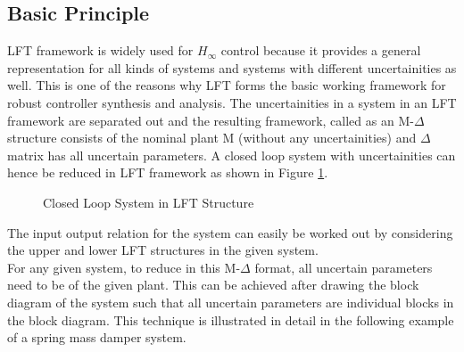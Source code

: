 \documentclass[a4paper,12pt]{article}
\begin{document}
		\subsection{Basic Principle} LFT framework is widely used for $H_{\infty}$ control because it provides a general representation for all kinds of systems and systems with different uncertainities as well. This is one of the reasons why LFT forms the basic working framework for robust controller synthesis and analysis. The uncertainities in a system  in an LFT framework are separated out and the resulting framework, called as an M-$\Delta$ structure consists of the nominal plant M (without any uncertainities) and $\Delta$ matrix has all uncertain parameters. A closed loop system with uncertainities can hence be reduced in LFT framework as shown in Figure \ref{cllft}. 
		\begin{figure}[H]
 
			  \centering
			  
			  
			  \caption{Closed Loop System in LFT Structure}
			 \label{cllft}
		\end{figure}
		The input output relation for the system can easily be worked out by considering the upper and lower LFT structures in the given system. \\For any given system, to reduce in this M-$\Delta$ format, all uncertain parameters need to be  of the given plant. This can be achieved after drawing the block diagram of the system such that all uncertain parameters are individual  blocks in the block diagram. This technique is illustrated in detail in the following example of a spring mass damper system. 
\end{document}
